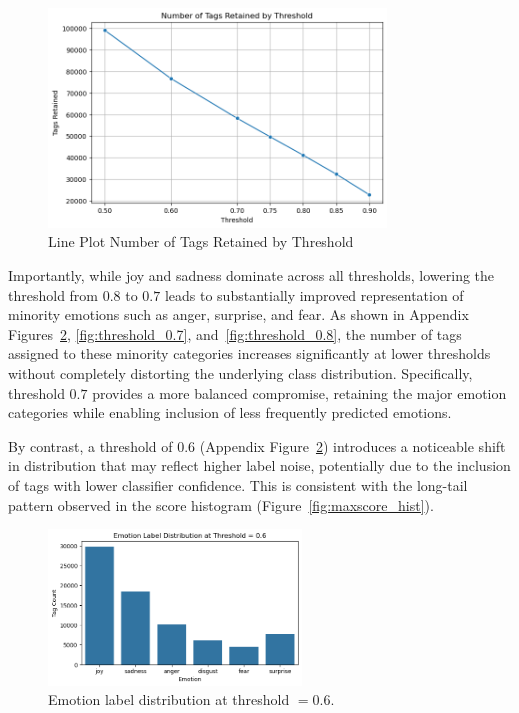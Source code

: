 \documentclass{article}
\begin{document}
\begin{figure}[H]
\centering
\includegraphics[width=0.8\textwidth]{Graphics/Appendix/Number of Tags Retianed by Threshold.png}
\caption{Line Plot Number of Tags Retained by Threshold}
\label{fig:threshold_line}
\end{figure}
\FloatBarrier

Importantly, while joy and sadness dominate across all thresholds, lowering the threshold from $0.8$ to $0.7$ leads to substantially improved representation of minority emotions such as anger, surprise, and fear. As shown in Appendix Figures~\ref{fig:threshold_0.6}, \ref{fig:threshold_0.7}, and~\ref{fig:threshold_0.8}, the number of tags assigned to these minority categories increases significantly at lower thresholds without completely distorting the underlying class distribution. Specifically, threshold $0.7$ provides a more balanced compromise, retaining the major emotion categories while enabling inclusion of less frequently predicted emotions.

By contrast, a threshold of $0.6$ (Appendix Figure~\ref{fig:threshold_0.6}) introduces a noticeable shift in distribution that may reflect higher label noise, potentially due to the inclusion of tags with lower classifier confidence. This is consistent with the long-tail pattern observed in the score histogram (Figure~\ref{fig:maxscore_hist}). 

\begin{figure}[h]
  \centering
  \includegraphics[width=0.6\textwidth]{Graphics/Appendix/0.6 Threshold.png}
  \caption{Emotion label distribution at threshold $=0.6$.}
  \label{fig:threshold_0.6}
\end{figure}
\end{document}

